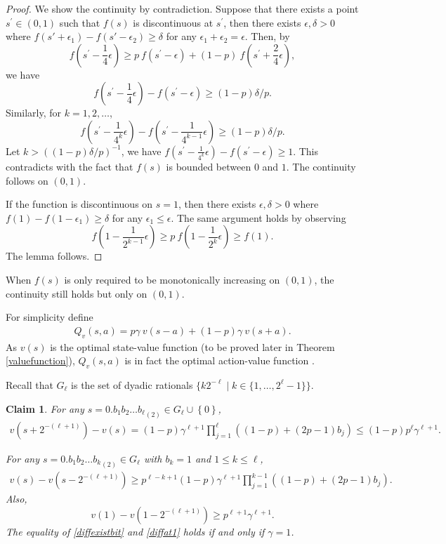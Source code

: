 \documentclass{article}
\newtheorem{claim}[theorem]{Claim}
\theoremstyle{named}
\newcommand{\set}[1]{\left\{#1\right\}}
\newcommand{\bracket}[1]{\left(#1\right)}
\begin{document}
\begin{proof}
We show the continuity by contradiction. Suppose that there exists a point $s^\prime\in (0,1)$ such that $f(s)$ is discontinuous at $s^\prime$, then there exists $\epsilon,\delta>0$ where $f(s'+\epsilon_1)-f(s'-\epsilon_2)\geq \delta$ for any $\epsilon_1+\epsilon_2=\epsilon$.
Then, by
\[
f(s^\prime-\frac{1}{4}\epsilon) \geq p\ f(s^\prime-\epsilon)+(1-p)\ f(s^\prime+\frac{2}{4}\epsilon),
\]
we have
\[
f(s^\prime-\frac{1}{4}\epsilon)-f(s^\prime-\epsilon) \geq (1-p)\delta/p.
\]
Similarly, for $k=1,2,\dots$,
\[
f(s^\prime-\frac{1}{4^k}\epsilon) - f(s^\prime-\frac{1}{4^{k-1}}\epsilon) \geq   (1-p)\delta/p.
\]
Let $k>((1-p)\delta/p)^{-1}$, we have $f(s^\prime-\frac{1}{4^k}\epsilon)-f(s^\prime-\epsilon)\geq 1$. This contradicts with the fact that $f(s)$ is bounded between $0$ and $1$. The continuity follows on $(0,1)$.

If the function is discontinuous on $s=1$, then there exists $\epsilon, \delta>0$ where $f(1)-f(1-\epsilon_1)\geq \delta$ for any $\epsilon_1\leq\epsilon$. The same argument holds by observing 
\[
f(1-\frac{1}{2^{k-1}}\epsilon) \geq p\ f(1-\frac{1}{2^k}\epsilon) \geq f(1).
\]
The lemma follows.
\end{proof}

When $f(s)$ is only required to be monotonically increasing on $(0,1)$, the continuity still holds but only on $(0,1)$.

For simplicity define
\begin{align}
Q_v(s,a) = p \gamma \ v(s-a) + (1-p) \gamma \ v(s+a)  .
\end{align}
As $v(s)$ is the optimal state-value function (to be proved later in Theorem \ref{valuefunction}), $Q_v(s,a)$ is in fact the optimal action-value function \citep{sutton2018reinforcement,szepesvari2010algorithms}.

Recall that $G_\ell$ is the set of dyadic rationals $\{k2^{-\ell}\mid k\in \{1,\dots,2^\ell-1\}\}$.

\begin{claim}
\label{claim:vdifference}
For any $s={0.b_1 b_2 \dots b_\ell}_{(2)} \in G_{\ell} \cup \set{0}$,
\begin{align}
\label{diffnewbit}
v\bracket{s+2^{-(\ell+1)}} - v(s) = (1-p)\gamma^{\ell+1}\prod_{j=1}^{\ell}\bracket{(1-p)+(2p-1)b_j} \le (1-p) p^\ell \gamma^{\ell+1} .
\end{align}

For any $s={0.b_1 b_2 \dots b_k}_{(2)} \in G_{\ell}$ with $b_k=1$ and $1 \le k\le \ell$,
\begin{align}
\label{diffexistbit}
v(s) - v\bracket{s-2^{-(\ell+1)}} \ge p^{\ell-k+1}(1-p)\gamma^{\ell+1}\prod_{j=1}^{k-1}\bracket{(1-p)+(2p-1)b_j} .
\end{align}
Also, 
\begin{equation}
\label{diffat1}
v(1) - v\bracket{1-2^{-(\ell+1)}} \ge p^{\ell+1} \gamma^{\ell+1} .
\end{equation}
The equality of \eqref{diffexistbit} and \eqref{diffat1} holds if and only if $\gamma=1$.
\end{claim}
\end{document}
